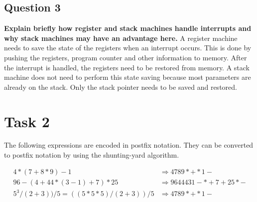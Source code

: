 \subsection*{Question 3}
\textbf{Explain briefly how register and stack machines handle interrupts and why stack machines may have an advantage here.}
A register machine needs to save the state of the registers when an interrupt occurs. This is done by pushing the registers, program counter and other information to memory. After the interrupt is handled, the registers need to be restored from memory. A stack machine does not need to perform this state saving because most parameters are already on the stack. Only the stack pointer needs to be saved and restored.


\section*{Task 2}

The following expressions are encoded in postfix notation. They can be converted to postfix notation by using the shunting-yard algorithm.

\begin{align*}
  4 * (7 + 8 * 9) - 1 &\Rightarrow   4789*+*1- \\
  96 - (4 + 44 * (3 - 1) + 7) * 25 &\Rightarrow   9644431-*+7+25*-\\
  5^{3} / ( 2 + 3)) / 5=((5*5*5) / ( 2 + 3)) / 5 &\Rightarrow   4789*+*1-
\end{align*}

